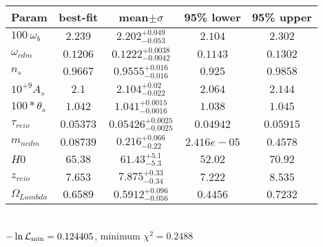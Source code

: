 \begin{tabular}{|l|c|c|c|c|} 
 \hline 
Param & best-fit & mean$\pm\sigma$ & 95\% lower & 95\% upper \\ \hline 
$100~\omega{}_{b }$ &$2.239$ & $2.202_{-0.053}^{+0.049}$ & $2.104$ & $2.302$ \\ 
$\omega{}_{cdm }$ &$0.1206$ & $0.1222_{-0.0042}^{+0.0038}$ & $0.1143$ & $0.1302$ \\ 
$n_{s }$ &$0.9667$ & $0.9555_{-0.016}^{+0.016}$ & $0.925$ & $0.9858$ \\ 
$10^{+9}A_{s }$ &$2.1$ & $2.104_{-0.022}^{+0.02}$ & $2.064$ & $2.144$ \\ 
$100*\theta{}_{s }$ &$1.042$ & $1.041_{-0.0016}^{+0.0015}$ & $1.038$ & $1.045$ \\ 
$\tau{}_{reio }$ &$0.05373$ & $0.05426_{-0.0025}^{+0.0025}$ & $0.04942$ & $0.05915$ \\ 
$m_{ncdm }$ &$0.08739$ & $0.216_{-0.22}^{+0.066}$ & $2.416e-05$ & $0.4578$ \\ 
$H0$ &$65.38$ & $61.43_{-5.3}^{+5.1}$ & $52.02$ & $70.92$ \\ 
$z_{reio }$ &$7.653$ & $7.875_{-0.34}^{+0.33}$ & $7.222$ & $8.535$ \\ 
$\Omega{}_{Lambda }$ &$0.6589$ & $0.5912_{-0.056}^{+0.096}$ & $0.4456$ & $0.7232$ \\ 
\hline 
 \end{tabular} \\ 
$-\ln{\cal L}_\mathrm{min} =0.124405$, minimum $\chi^2=0.2488$ \\ 
